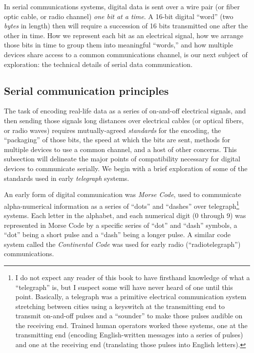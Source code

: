 In serial communications systems, digital data is sent over a wire pair (or fiber optic cable, or radio channel) \textit{one bit at a time}.  A 16-bit digital ``word'' (two \textit{bytes} in length) then will require a succession of 16 bits transmitted one after the other in time.  How we represent each bit as an electrical signal, how we arrange those bits in time to group them into meaningful ``words,'' and how multiple devices share access to a common communications channel, is our next subject of exploration: the technical details of serial data communication.












\filbreak
\subsection{Serial communication principles}

The task of encoding real-life data as a series of on-and-off electrical signals, and then sending those signals long distances over electrical cables (or optical fibers, or radio waves) requires mutually-agreed \textit{standards} for the encoding, the ``packaging'' of those bits, the speed at which the bits are sent, methods for multiple devices to use a common channel, and a host of other concerns.  This subsection will delineate the major points of compatibility necessary for digital devices to communicate serially.  We begin with a brief exploration of some of the standards used in early \textit{telegraph} systems.

An early form of digital communication was \textit{Morse Code}, used to communicate alpha-numerical information as a series of ``dots'' and ``dashes'' over telegraph\footnote{I do not expect any reader of this book to have firsthand knowledge of what a ``telegraph'' is, but I suspect some will have never heard of one until this point.  Basically, a telegraph was a primitive electrical communication system stretching between cities using a keyswitch at the transmitting end to transmit on-and-off pulses and a ``sounder'' to make those pulses audible on the receiving end.  Trained human operators worked these systems, one at the transmitting end (encoding English-written messages into a series of pulses) and one at the receiving end (translating those pulses into English letters).} systems.  Each letter in the alphabet, and each numerical digit (0 through 9) was represented in Morse Code by a specific series of ``dot'' and ``dash'' symbols, a ``dot'' being a short pulse and a ``dash'' being a longer pulse.  A similar code system called the \textit{Continental Code} was used for early radio (``radiotelegraph'') communications.        

